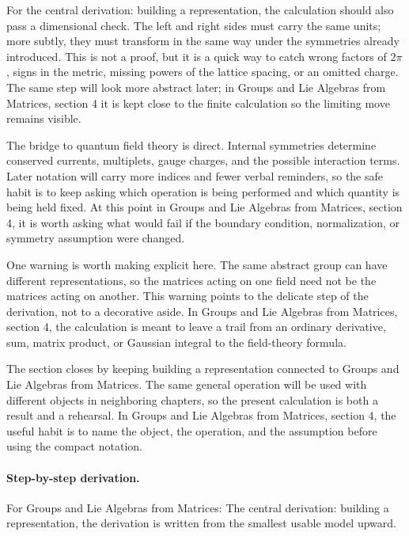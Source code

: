 For the central derivation: building a representation, the calculation should also pass a dimensional check.  The left and right sides must carry the same units; more subtly, they must transform in the same way under the symmetries already introduced.  This is not a proof, but it is a quick way to catch wrong factors of \(2\pi\), signs in the metric, missing powers of the lattice spacing, or an omitted charge.  The same step will look more abstract later; in Groups and Lie Algebras from Matrices, section 4 it is kept close to the finite calculation so the limiting move remains visible.

The bridge to quantum field theory is direct.  Internal symmetries determine conserved currents, multiplets, gauge charges, and the possible interaction terms.  Later notation will carry more indices and fewer verbal reminders, so the safe habit is to keep asking which operation is being performed and which quantity is being held fixed.  At this point in Groups and Lie Algebras from Matrices, section 4, it is worth asking what would fail if the boundary condition, normalization, or symmetry assumption were changed.

One warning is worth making explicit here.  The same abstract group can have different representations, so the matrices acting on one field need not be the matrices acting on another.  This warning points to the delicate step of the derivation, not to a decorative aside.  In Groups and Lie Algebras from Matrices, section 4, the calculation is meant to leave a trail from an ordinary derivative, sum, matrix product, or Gaussian integral to the field-theory formula.

The section closes by keeping building a representation connected to Groups and Lie Algebras from Matrices.  The same general operation will be used with different objects in neighboring chapters, so the present calculation is both a result and a rehearsal.  In Groups and Lie Algebras from Matrices, section 4, the useful habit is to name the object, the operation, and the assumption before using the compact notation.



\paragraph{Step-by-step derivation.}

For Groups and Lie Algebras from Matrices: The central derivation: building a representation, the derivation is written from the smallest usable model upward.

